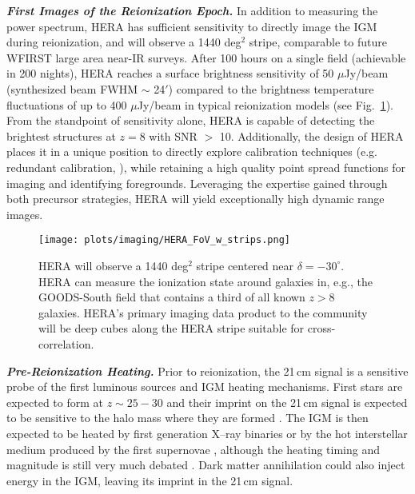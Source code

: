 \documentclass[preprint,11pt]{aastex}
\begin{document}
\emph{\textbf{First Images of the Reionization Epoch.}}
\label{sec:imaging}
In addition to measuring the power spectrum, HERA has sufficient 
sensitivity to directly image the IGM during reionization,
and will observe a 1440 deg$^2$ stripe, comparable to future WFIRST
large area near-IR surveys.
 After 100 hours on a
single field (achievable in 200 nights), HERA reaches a surface brightness 
sensitivity of 50 $\mu$Jy/beam (synthesized beam FWHM $\sim$ 24$'$) compared 
to the brightness temperature fluctuations of up to 400 $\mu$Jy/beam in typical 
reionization models (see Fig.~\ref{fig:LSS}). From the standpoint of sensitivity alone, HERA is capable of 
detecting the brightest structures at $z=8$ with SNR $>$ 10. Additionally, the design 
of HERA places it in a unique position to directly explore calibration techniques
(e.g. redundant calibration, \citealt{liu_et_al2010}), while retaining a high quality 
point spread functions for imaging and identifying foregrounds. Leveraging the expertise gained 
through both precursor strategies, HERA will yield exceptionally high dynamic range
images.


\begin{figure}[b!]
\centering
\vspace{-15pt}
    \texttt{[image: plots/imaging/HERA\_FoV\_w\_strips.png]}
  \vspace{-20pt}
\caption{\footnotesize 
HERA will observe a 1440 deg$^2$ stripe centered near $\delta = -30^\circ$. HERA can measure the ionization state around galaxies in, e.g., the GOODS-South field that contains a third of all known $z\!>\!8$ galaxies. HERA's primary imaging data product to the community will be deep cubes along the HERA stripe suitable for cross-correlation.
\label{fig:LSS} }
\vspace{-10pt}
\end{figure}

\emph{\textbf{Pre-Reionization Heating.}}
\label{sec:EoX} 
Prior to reionization, the 21\,cm signal is a sensitive probe of the first
luminous sources and IGM heating mechanisms. First stars are expected to form
at $z \sim 25-30$ and their imprint on the 21\,cm signal is expected to be
sensitive to the halo mass where they are formed \citep{mesinger_et_al2015}.
The IGM is then expected to be heated by first
generation X--ray binaries
\citep{furlanetto_et_al2006_global,pritchard_et_al2007,mesinger_et_al2013} or
by the hot interstellar medium produced by the first supernovae
\citep{pacucci_et_al2014}, although the heating timing and magnitude is still
very much debated \citep{fialkov_et_al2012}. Dark matter annihilation
\citep{evoli_et_al2014} could also inject energy in the IGM, leaving its
imprint in the 21\,cm signal.
 
\end{document}
